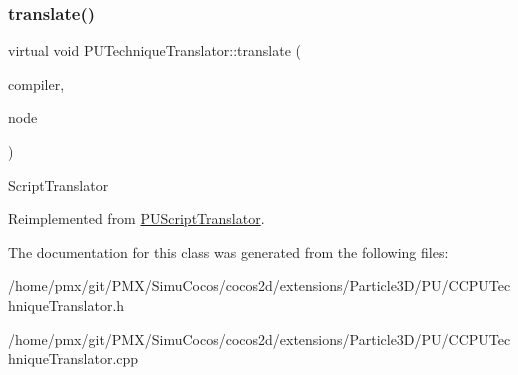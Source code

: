 \subsubsection{\texorpdfstring{translate()}{translate()}\hspace{0.1cm}{\footnotesize\ttfamily [2/2]}}
{\footnotesize\ttfamily virtual void P\+U\+Technique\+Translator\+::translate (\begin{DoxyParamCaption}\item[{\hyperlink{classPUScriptCompiler}{P\+U\+Script\+Compiler} $\ast$}]{compiler,  }\item[{\hyperlink{classPUAbstractNode}{P\+U\+Abstract\+Node} $\ast$}]{node }\end{DoxyParamCaption})\hspace{0.3cm}{\ttfamily [virtual]}}

Script\+Translator 

Reimplemented from \hyperlink{classPUScriptTranslator_a9ff2cdfda9ea8db6fd716e7b69dbe79b}{P\+U\+Script\+Translator}.



The documentation for this class was generated from the following files\+:\begin{DoxyCompactItemize}
\item 
/home/pmx/git/\+P\+M\+X/\+Simu\+Cocos/cocos2d/extensions/\+Particle3\+D/\+P\+U/C\+C\+P\+U\+Technique\+Translator.\+h\item 
/home/pmx/git/\+P\+M\+X/\+Simu\+Cocos/cocos2d/extensions/\+Particle3\+D/\+P\+U/C\+C\+P\+U\+Technique\+Translator.\+cpp\end{DoxyCompactItemize}
